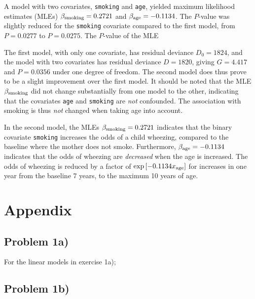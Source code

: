 \documentclass[a4paper,11pt]{article}
\begin{document}
\begin{enumerate}[label=\alph*)]
        A model with two covariates, \texttt{smoking} and \texttt{age}, yielded maximum likelihood estimates (MLEs) $\beta_{\rm smoking} = 0.2721$ and $\beta_{\rm age} = -0.1134$. The $P$-value was slightly reduced for the \texttt{smoking} covariate compared to the first model, from $P = 0.0277$ to $P= 0.0275$. The $P$-value of the MLE 

        The first model, with only one covariate, has residual deviance $D_0 = 1824$, and the model with two covariates has residual deviance $D = 1820$, giving $G = 4.417$ and $P = 0.0356$ under one degree of freedom. The second model does thus prove to be a slight improvement over the first model. It should be noted that the MLE $\beta_{\rm smoking}$ did not change substantially from one model to the other, indicating that the covariates \texttt{age} and \texttt{smoking} are \textit{not} confounded. The association with smoking is thus \textit{not} changed when taking age into account.

        In the second model, the MLEs $\beta_{\rm smoking} = 0.2721$ indicates that the binary covariate \texttt{smoking} increases the odds of a child wheezing, compared to the baseline where the mother does not smoke. Furthermore, $\beta_{\rm age} = -0.1134$ indicates that the odds of wheezing are \textit{decreased} when the age is increased. The odds of wheezing is reduced by a factor of $\exp\left[ -0.1134 x_{\rm age} \right]$ for increases in one year from the baseline 7 years, to the maximum 10 years of age. 

\end{enumerate}



%
%

\clearpage
\appendix
\section{Appendix}
\label{sec:appendix}

\subsection{Problem 1a)}
\label{app:1a}

For the linear models in exercise 1a);
{\footnotesize
    
}

\subsection{Problem 1b)}
\label{app:1b}
\end{document}
